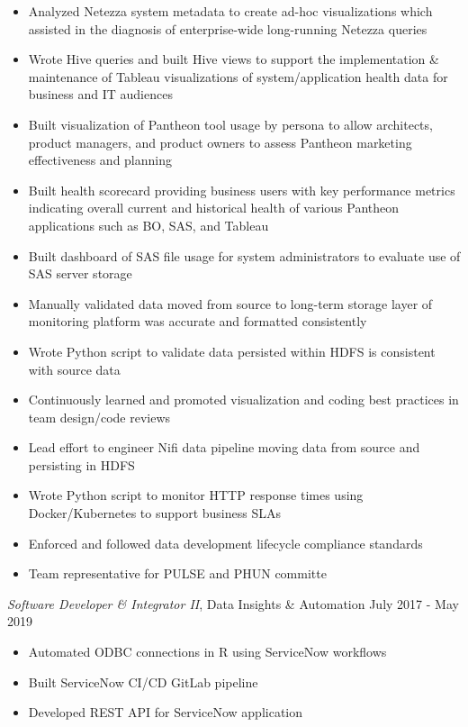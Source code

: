 \documentclass[a4paper]{article}
\begin{document}
\begin{itemize} \itemsep .5pt
	\item Analyzed Netezza system metadata to create ad-hoc visualizations which assisted in the diagnosis of enterprise-wide long-running Netezza queries
        \item Wrote Hive queries and built Hive views to support the implementation \& maintenance of Tableau visualizations of system/application health data for business and IT audiences
	\item Built visualization of Pantheon tool usage by persona to allow architects, product managers, and product owners to assess Pantheon marketing effectiveness and planning
	\item Built health scorecard providing business users with key performance metrics indicating overall current and historical health of various Pantheon applications such as BO, SAS, and Tableau
	\item Built dashboard of SAS file usage for system administrators to evaluate use of SAS server storage
        \item Manually validated data moved from source to long-term storage layer of monitoring platform was accurate and formatted consistently
        \item Wrote Python script to validate data persisted within HDFS is consistent with source data
        \item Continuously learned and promoted visualization and coding best practices in team design/code reviews
        \item Lead effort to engineer Nifi data pipeline moving data from source and persisting in HDFS
        \item Wrote Python script to monitor HTTP response times using Docker/Kubernetes to support business SLAs
        \item Enforced and followed data development lifecycle compliance standards
	\item Team representative for PULSE and PHUN committe
\end{itemize}
\textit{Software Developer \& Integrator II}, Data Insights \& Automation \hfill July 2017 - May 2019\\
\vspace{-2mm}
\begin{itemize} \itemsep .5pt
	\item Automated ODBC connections in R using ServiceNow workflows
	\item Built ServiceNow CI/CD GitLab pipeline
	\item Developed REST API for ServiceNow application 
\end{itemize}
\end{document}
